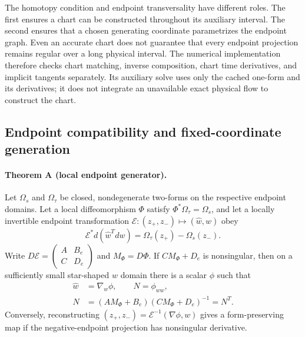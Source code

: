 The homotopy condition and endpoint transversality have different roles. The first ensures a chart can be constructed throughout its auxiliary interval. The second ensures that a chosen generating coordinate parametrizes the endpoint graph. Even an accurate chart does not guarantee that every endpoint projection remains regular over a long physical interval. The numerical implementation therefore checks chart matching, inverse composition, chart time derivatives, and implicit tangents separately. Its auxiliary solve uses only the cached one-form and its derivatives; it does not integrate an unavailable exact physical flow to construct the chart.

\subsection{Endpoint compatibility and fixed-coordinate generation}
\paragraph{Theorem A (local endpoint generator).}\label{thm:endpoint}
Let $\Omega_s$ and $\Omega_\tau$ be closed, nondegenerate two-forms on the respective endpoint domains. Let a local diffeomorphism $\Phi$ satisfy $\Phi^*\Omega_\tau=\Omega_s$, and let a locally invertible endpoint transformation $\mathcal E:(z_+,z_-)\mapsto(\widehat w,w)$ obey
\begin{equation}
 \mathcal E^*d(\widehat w^Tdw)=\Omega_\tau(z_+)-\Omega_s(z_-).
 \label{eq:th-endpoint-pullback}
\end{equation}
Write $D\mathcal E=\left(\begin{smallmatrix}A&B_e\\C&D_e\end{smallmatrix}\right)$ and $M_\Phi=D\Phi$. If $CM_\Phi+D_e$ is nonsingular, then on a sufficiently small star-shaped $w$ domain there is a scalar $\phi$ such that
\begin{equation}
 \begin{aligned}
 \widehat w&=\nabla_w\phi,\qquad N=\phi_{ww},\\
 N&=(AM_\Phi+B_e)(CM_\Phi+D_e)^{-1}=N^T.
\end{aligned}
 \label{eq:th-endpoint-hessian}
\end{equation}
Conversely, reconstructing $(z_+,z_-)=\mathcal E^{-1}(\nabla\phi,w)$ gives a form-preserving map if the negative-endpoint projection has nonsingular derivative.

